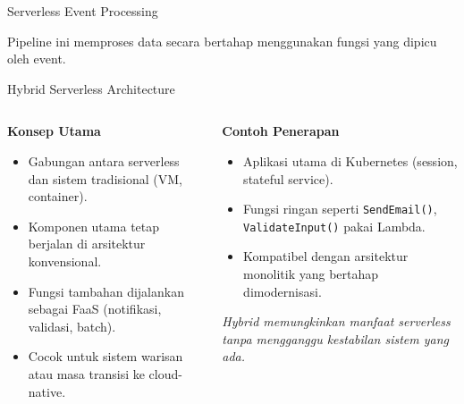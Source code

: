 \documentclass[aspectratio=169, table]{beamer}
\begin{document}
\begin{frame}[fragile]{Serverless Event Processing}
	
	\vspace{8pt}
	\scriptsize
	Pipeline ini memproses data secara bertahap menggunakan fungsi yang dipicu oleh event.
\end{frame}


\begin{frame}[fragile]{Hybrid Serverless Architecture}
	\vspace{10pt}
	\begin{columns}[T]
		\begin{column}{0.5\textwidth}
			\textbf{Konsep Utama}
			\begin{itemize}
				\item Gabungan antara serverless dan sistem tradisional (VM, container).
				\item Komponen utama tetap berjalan di arsitektur konvensional.
				\item Fungsi tambahan dijalankan sebagai FaaS (notifikasi, validasi, batch).
				\item Cocok untuk sistem warisan atau masa transisi ke cloud-native.
			\end{itemize}
		\end{column}
		
		\begin{column}{0.5\textwidth}
			\textbf{Contoh Penerapan}
			\begin{itemize}
				\item Aplikasi utama di Kubernetes (session, stateful service).
				\item Fungsi ringan seperti \texttt{SendEmail()}, \texttt{ValidateInput()} pakai Lambda.
				\item Kompatibel dengan arsitektur monolitik yang bertahap dimodernisasi.
			\end{itemize}
			
			\vspace{6pt}
			\scriptsize
			\textit{Hybrid memungkinkan manfaat serverless tanpa mengganggu kestabilan sistem yang ada.}
		\end{column}
	\end{columns}
\end{frame}
\end{document}

